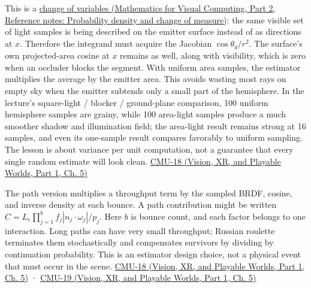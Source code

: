 This is a \href{../02-Mathematics-for-Visual-Computing-P02/main.pdf\#appendix-4815cd87ab8b}{change of variables (Mathematics for Visual Computing, Part 2, Reference notes: Probability density and change of measure)}: the same visible set of light samples is being described on the emitter surface instead of as directions at \(x\). Therefore the integrand must acquire the Jacobian \(\cos\theta_y/r^2\). The surface's own projected-area cosine at \(x\) remains as well, along with visibility, which is zero when an occluder blocks the segment. With uniform area samples, the estimator multiplies the average by the emitter area. This avoids wasting most rays on empty sky when the emitter subtends only a small part of the hemisphere. In the lecture's square-light / blocker / ground-plane comparison, 100 uniform hemisphere samples are grainy, while 100 area-light samples produce a much smoother shadow and illumination field; the area-light result remains strong at 16 samples, and even its one-sample result compares favorably to uniform sampling. The lesson is about variance per unit computation, not a guarantee that every single random estimate will look clean. \href{../07-Vision-XR-and-Playable-Worlds-P01/main.pdf\#04-visual-computing-ii-ch036-cmu-18---monte-carlo-rendering}{CMU-18 (Vision, XR, and Playable Worlds, Part 1, Ch. 5)}

The path version multiplies a throughput term by the sampled BRDF, cosine, and inverse density at each bounce. A path contribution might be written \(C= L_e\prod_{j=1}^b f_j|n_j\cdot\omega_j|/p_j\). Here \(b\) is bounce count, and each factor belongs to one interaction. Long paths can have very small throughput; Russian roulette terminates them stochastically and compensates survivors by dividing by continuation probability. This is an estimator design choice, not a physical event that must occur in the scene. \href{../07-Vision-XR-and-Playable-Worlds-P01/main.pdf\#04-visual-computing-ii-ch036-cmu-18---monte-carlo-rendering}{CMU-18 (Vision, XR, and Playable Worlds, Part 1, Ch. 5)} · \href{../07-Vision-XR-and-Playable-Worlds-P01/main.pdf\#04-visual-computing-ii-ch036-cmu-19---variance-reduction}{CMU-19 (Vision, XR, and Playable Worlds, Part 1, Ch. 5)}

